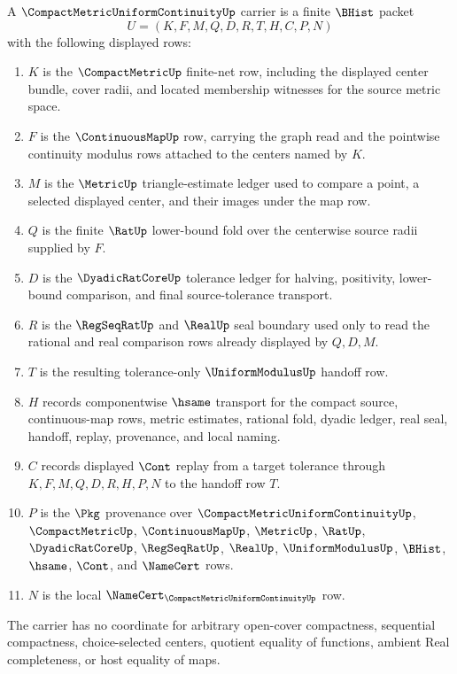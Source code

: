 \begin{definition}
\label{def:compact-metric-uniform-continuity-carrier}
A $\CompactMetricUniformContinuityUp$ carrier is a finite $\BHist$ packet
$$
U=(K,F,M,Q,D,R,T,H,C,P,N)
$$
with the following displayed rows:
\begin{enumerate}
\item $K$ is the $\CompactMetricUp$ finite-net row, including the displayed center bundle, cover radii, and located membership witnesses for the source metric space.
\item $F$ is the $\ContinuousMapUp$ row, carrying the graph read and the pointwise continuity modulus rows attached to the centers named by $K$.
\item $M$ is the $\MetricUp$ triangle-estimate ledger used to compare a point, a selected displayed center, and their images under the map row.
\item $Q$ is the finite $\RatUp$ lower-bound fold over the centerwise source radii supplied by $F$.
\item $D$ is the $\DyadicRatCoreUp$ tolerance ledger for halving, positivity, lower-bound comparison, and final source-tolerance transport.
\item $R$ is the $\RegSeqRatUp$ and $\RealUp$ seal boundary used only to read the rational and real comparison rows already displayed by $Q,D,M$.
\item $T$ is the resulting tolerance-only $\UniformModulusUp$ handoff row.
\item $H$ records componentwise $\hsame$ transport for the compact source, continuous-map rows, metric estimates, rational fold, dyadic ledger, real seal, handoff, replay, provenance, and local naming.
\item $C$ records displayed $\Cont$ replay from a target tolerance through $K,F,M,Q,D,R,H,P,N$ to the handoff row $T$.
\item $P$ is the $\Pkg$ provenance over $\CompactMetricUniformContinuityUp$, $\CompactMetricUp$, $\ContinuousMapUp$, $\MetricUp$, $\RatUp$, $\DyadicRatCoreUp$, $\RegSeqRatUp$, $\RealUp$, $\UniformModulusUp$, $\BHist$, $\hsame$, $\Cont$, and $\NameCert$ rows.
\item $N$ is the local $\NameCert_{\CompactMetricUniformContinuityUp}$ row.
\end{enumerate}
The carrier has no coordinate for arbitrary open-cover compactness, sequential compactness, choice-selected centers, quotient equality of functions, ambient Real completeness, or host equality of maps.
\end{definition}

